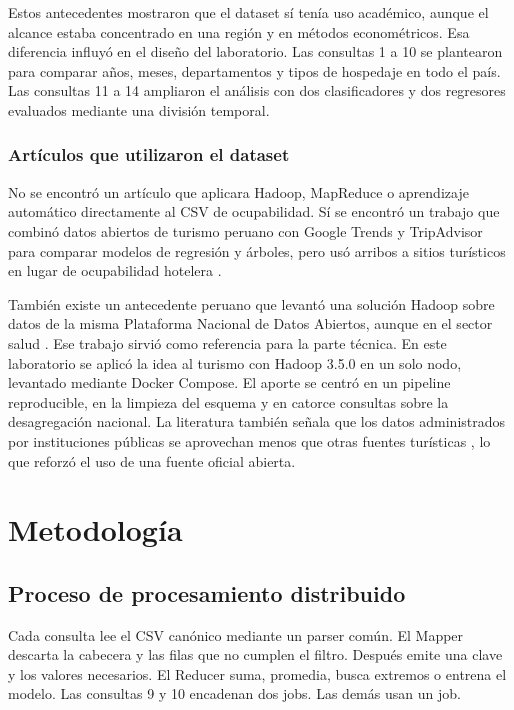 \documentclass[10pt,a4paper]{article}
\theoremstyle{definition}
\begin{document}
Estos antecedentes mostraron que el dataset sí tenía uso académico, aunque el
alcance estaba concentrado en una región y en métodos econométricos. Esa
diferencia influyó en el diseño del laboratorio. Las consultas 1 a 10 se
plantearon para comparar años, meses, departamentos y tipos de hospedaje en
todo el país. Las consultas 11 a 14 ampliaron el análisis con dos
clasificadores y dos regresores evaluados mediante una división temporal.
\subsubsection{Artículos que utilizaron el dataset}
No se encontró un artículo que aplicara Hadoop, MapReduce o aprendizaje
automático directamente al CSV de ocupabilidad. Sí se encontró un trabajo que
combinó datos abiertos de turismo peruano con Google Trends y TripAdvisor para
comparar modelos de regresión y árboles, pero usó arribos a sitios turísticos
en lugar de ocupabilidad hotelera \cite{bravo_moche_ml2023}.

También existe un antecedente peruano que levantó una solución Hadoop sobre
datos de la misma Plataforma Nacional de Datos Abiertos, aunque en el sector
salud \cite{viteri_hadoop_minisa2023}. Ese trabajo sirvió como referencia para
la parte técnica. En este laboratorio se aplicó la idea al turismo con Hadoop
3.5.0 en un solo nodo, levantado mediante Docker Compose. El aporte se centró
en un pipeline reproducible, en la limpieza del esquema y en catorce consultas
sobre la desagregación nacional. La literatura también señala que los datos
administrados por instituciones públicas se aprovechan menos que otras fuentes
turísticas \cite{mariani_baggio_bigdata2022}, lo que reforzó el uso de una
fuente oficial abierta.

\section{Metodología}
\subsection{Proceso de procesamiento distribuido}
Cada consulta lee el CSV canónico mediante un parser común. El Mapper descarta
la cabecera y las filas que no cumplen el filtro. Después emite una clave y los
valores necesarios. El Reducer suma, promedia, busca extremos o entrena el
modelo. Las consultas 9 y 10 encadenan dos jobs. Las demás usan un job.
\end{document}
